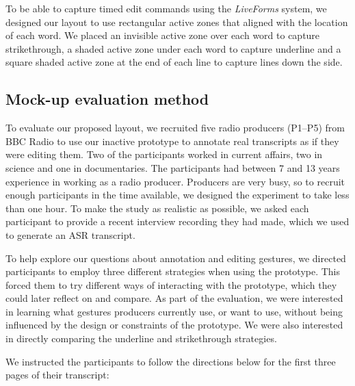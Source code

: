 To be able to capture timed edit commands using the \textit{Live\texttrademark Forms} system, we designed our layout to
use rectangular active zones that aligned with the location of each word.
We placed an invisible active zone over each word to capture strikethrough, a shaded active zone under each word to
capture underline and a square shaded active zone at the end of each line to capture lines down the side.

\subsection{Mock-up evaluation method}

To evaluate our proposed layout, we recruited five radio producers (P1--P5) from BBC Radio to use our inactive
prototype to annotate real transcripts as if they were editing them.  Two of the participants worked in current
affairs, two in science and one in documentaries.  The participants had between 7 and 13 years experience in working as
a radio producer.  Producers are very busy, so to recruit enough participants in the time available, we designed the
experiment to take less than one hour.  To make the study as realistic as possible, we asked each participant to
provide a recent interview recording they had made, which we used to generate an ASR transcript.

To help explore our questions about annotation and editing gestures, we directed participants to employ three different
strategies when using the prototype. This forced them to try different ways of interacting with the prototype, which
they could later reflect on and compare.  As part of the evaluation, we were interested in learning what gestures
producers currently use, or want to use, without being influenced by the design or constraints of the prototype.
We were also interested in directly comparing the underline and strikethrough strategies.

We instructed the participants to follow the directions below for the first three pages of their transcript: 



